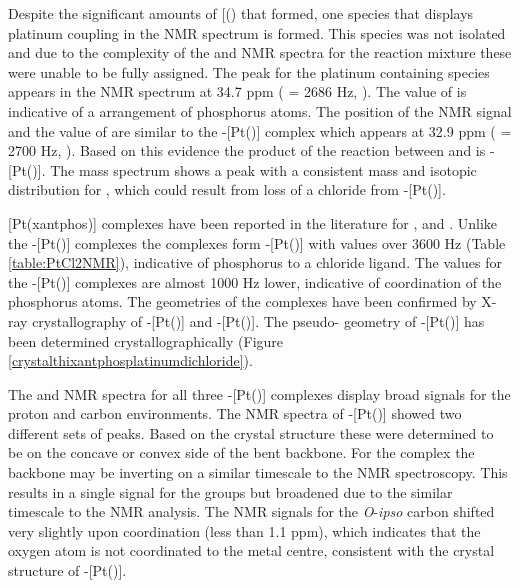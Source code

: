 Despite the significant amounts of [(\tBusixantphos{})\ce{H]+} that formed, one species that displays platinum coupling in the \phosphorus{} NMR spectrum is formed.  This species was not isolated and due to the complexity of the \proton{} and \carbon{} NMR spectra for the reaction mixture these were unable to be fully assigned.  The peak for the  platinum containing species appears in the \phosphorus{} NMR spectrum at 34.7 ppm (\JPtP{} = 2686 Hz, ).  The value of \JPtP{} is indicative of a \trans{} arrangement of phosphorus atoms.\cite{Rigamonti2010, Appleton1978, Pregosin1980}  The position of the \phosphorus{} NMR signal and the value of \JPtP{} are similar to the \trans-[Pt(\tButhixantphos)] complex which appears at 32.9 ppm (\JPtP{} = 2700 Hz, ).  Based on this evidence the product of the reaction between \tBusixantphos{} and \ce{[Pt(C6H10)Cl2]} is \trans{}-[Pt(\tBusixantphos)].  The mass spectrum shows a peak with a consistent mass and isotopic distribution for , which could result from loss of a chloride from \trans-[Pt(\tBusixantphos)].\cite{Henderson1998}

[Pt(xantphos)] complexes have been reported in the literature for \Phsixantphos, \Phthixantphos{} and \Phxantphos{}.\cite{Kranenburg1998b}  Unlike the \trans-[Pt(\tBuxantphos)] complexes the \Phxantphos{} complexes form \cis{}-[Pt(\Phxantphos)] with \JPtP{} values over 3600 Hz (Table \ref{table:PtCl2NMR}), indicative of phosphorus \trans{} to a chloride ligand.  The \JPtP{} values for the \trans-[Pt(\tBuxantphos)] complexes are almost 1000 Hz lower, indicative of \trans{} coordination of the phosphorus atoms.  The \cis{} geometries of the \Phxantphos{} complexes have been confirmed by X-ray crystallography of \cis{}-[Pt(\Phsixantphos)]\cite{Duren2007} and \cis{}-[Pt(\Phxantphos)].\cite{Niksch2010}  The pseudo-\trans{} geometry of \trans-[Pt(\tButhixantphos)] has been determined crystallographically (Figure \ref{crystalthixantphosplatinumdichloride}). 

The \proton{} and \carbon{} NMR spectra for all three \trans-[Pt(\tBuxantphos)] complexes display broad signals for the \tBu{} proton and carbon environments.  The NMR spectra of \trans-[Pt(\tButhixantphos)] showed two different sets of \tBu{} peaks.  Based on the crystal structure these were determined to be on the concave or convex side of the bent backbone.  For the \tBuxantphos{} complex the backbone may be inverting on a similar timescale to the NMR spectroscopy.  This results in a single signal for the \tBu{} groups but broadened due to the similar timescale to the NMR analysis.  The \carbon{} NMR signals for the \emph{O}-\emph{ipso} carbon  shifted very slightly upon coordination (less than 1.1 ppm), which indicates that the oxygen atom is not coordinated to the metal centre, consistent with the crystal structure of \trans-[Pt(\tButhixantphos)].  

